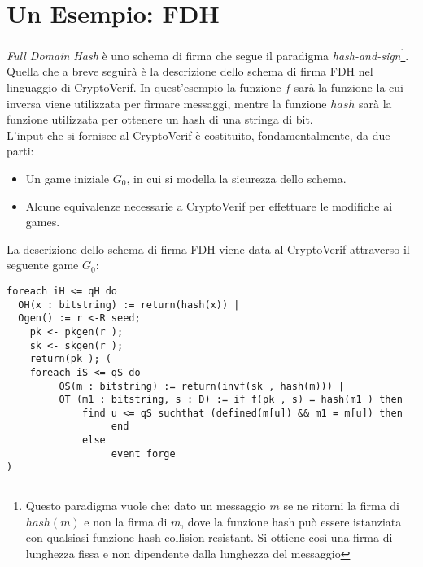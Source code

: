 \documentclass[a4paper,openright,twoside,12pt]{report}
\begin{document}
\section{Un Esempio: FDH}
\emph{Full Domain Hash} \`e uno schema di firma che segue il paradigma \emph{hash-and-sign}\footnote{Questo paradigma vuole che: dato un messaggio $m$ se ne ritorni 
la firma di $hash(m)$ e non la firma di $m$, dove la funzione hash pu\`o essere istanziata con qualsiasi funzione hash collision resistant. 
Si ottiene cos\`i una firma di lunghezza fissa e non dipendente dalla lunghezza del messaggio}. 
Quella che a breve seguir\`a \`e la descrizione dello schema di firma FDH nel linguaggio di CryptoVerif. In quest'esempio la funzione $f$ sar\`a la funzione la cui inversa
viene utilizzata per firmare messaggi, mentre la funzione $hash$ sar\`a la funzione utilizzata per ottenere un hash di una stringa di bit.\\
L'input che si fornisce al CryptoVerif \`e costituito, fondamentalmente, da due parti: 
\begin{itemize}
 \item Un game iniziale $G_0$, in cui si modella la sicurezza dello schema.
 \item Alcune equivalenze necessarie a CryptoVerif per effettuare le modifiche ai games. 
\end{itemize}
La descrizione dello schema di firma FDH viene data al CryptoVerif attraverso il seguente game $G_0$:

\begin{verbatim}
foreach iH <= qH do   
  OH(x : bitstring) := return(hash(x)) |
  Ogen() := r <-R seed;     
    pk <- pkgen(r );    
    sk <- skgen(r );       
    return(pk ); (
    foreach iS <= qS do 
         OS(m : bitstring) := return(invf(sk , hash(m))) |
         OT (m1 : bitstring, s : D) := if f(pk , s) = hash(m1 ) then
             find u <= qS suchthat (defined(m[u]) && m1 = m[u]) then
                  end
             else
                  event forge
)         
\end{verbatim}
\end{document}
